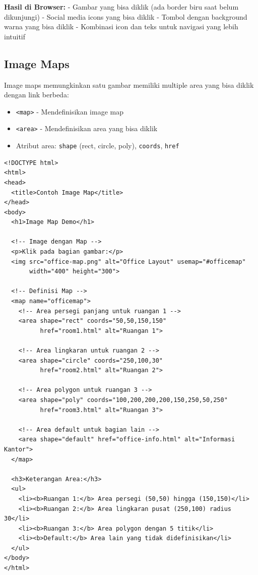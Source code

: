 \textbf{Hasil di Browser:}
- Gambar yang bisa diklik (ada border biru saat belum dikunjungi)
- Social media icons yang bisa diklik
- Tombol dengan background warna yang bisa diklik
- Kombinasi icon dan teks untuk navigasi yang lebih intuitif

\subsection{Image Maps}

Image maps memungkinkan satu gambar memiliki multiple area yang bisa diklik dengan link berbeda:

\begin{itemize}
  \item \texttt{<map>} - Mendefinisikan image map
  \item \texttt{<area>} - Mendefinisikan area yang bisa diklik
  \item Atribut area: \texttt{shape} (rect, circle, poly), \texttt{coords}, \texttt{href}
\end{itemize}

\begin{lstlisting}[caption={Contoh Image Map}, basicstyle=\ttfamily\small, frame=single]
<!DOCTYPE html>
<html>
<head>
  <title>Contoh Image Map</title>
</head>
<body>
  <h1>Image Map Demo</h1>
  
  <!-- Image dengan Map -->
  <p>Klik pada bagian gambar:</p>
  <img src="office-map.png" alt="Office Layout" usemap="#officemap" 
       width="400" height="300">
  
  <!-- Definisi Map -->
  <map name="officemap">
    <!-- Area persegi panjang untuk ruangan 1 -->
    <area shape="rect" coords="50,50,150,150" 
          href="room1.html" alt="Ruangan 1">
    
    <!-- Area lingkaran untuk ruangan 2 -->
    <area shape="circle" coords="250,100,30" 
          href="room2.html" alt="Ruangan 2">
    
    <!-- Area polygon untuk ruangan 3 -->
    <area shape="poly" coords="100,200,200,200,150,250,50,250" 
          href="room3.html" alt="Ruangan 3">
    
    <!-- Area default untuk bagian lain -->
    <area shape="default" href="office-info.html" alt="Informasi Kantor">
  </map>
  
  <h3>Keterangan Area:</h3>
  <ul>
    <li><b>Ruangan 1:</b> Area persegi (50,50) hingga (150,150)</li>
    <li><b>Ruangan 2:</b> Area lingkaran pusat (250,100) radius 30</li>
    <li><b>Ruangan 3:</b> Area polygon dengan 5 titik</li>
    <li><b>Default:</b> Area lain yang tidak didefinisikan</li>
  </ul>
</body>
</html>
\end{lstlisting}

